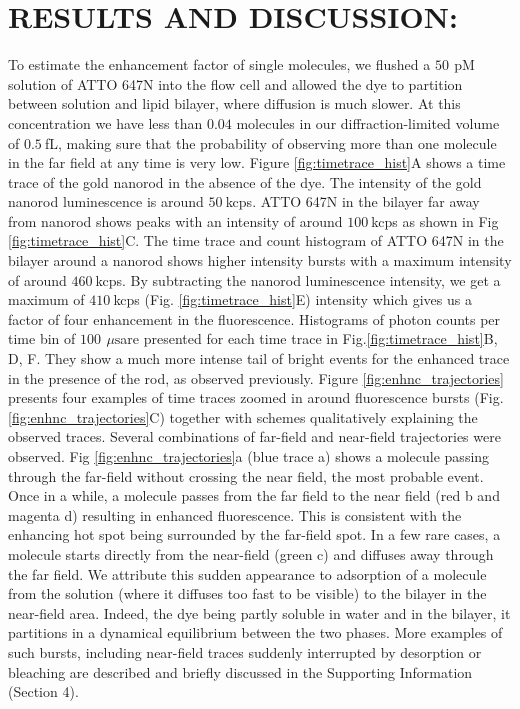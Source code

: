 \documentclass[journal=jacsat,manuscript=article]{achemso}
\newcommand{\pM}{\ensuremath{\,\textrm{pM}}}
\newcommand{\us}{\ensuremath{\,\mu\textrm{s}}}
\begin{document}
\section{RESULTS AND DISCUSSION:}
To estimate the enhancement factor of single molecules, we flushed a $50~$\pM solution of ATTO 647N into the flow cell and allowed the dye to partition between solution and lipid bilayer, where diffusion is much slower. At this concentration we have less than $0.04$ molecules in our diffraction-limited volume of $0.5~$fL, making sure that the probability of observing more than one molecule in the far field at any time is very low. Figure \ref{fig:timetrace_hist}A shows a time trace of the gold nanorod in the absence of the dye. The intensity of the gold nanorod luminescence is around $50~$kcps. ATTO 647N in the bilayer far away from nanorod shows peaks with an intensity of around $100~$kcps as shown in Fig \ref{fig:timetrace_hist}C. The time trace and count histogram of ATTO 647N in the bilayer around a nanorod shows higher intensity bursts with a maximum intensity of around $460~$kcps. By subtracting the nanorod luminescence intensity, we get a maximum of $410~$kcps (Fig. \ref{fig:timetrace_hist}E) intensity which gives us a factor of four enhancement in the fluorescence. Histograms of photon counts per time bin of $100~$\us are presented for each time trace in Fig.\ref{fig:timetrace_hist}B, D, F. They show a much more intense tail of bright events for the enhanced trace in the presence of the rod, as observed previously.\cite{khatua2014resonant} Figure \ref{fig:enhnc_trajectories} presents four examples of time traces zoomed in around fluorescence bursts (Fig. \ref{fig:enhnc_trajectories}C) together with schemes qualitatively explaining the observed traces. Several combinations of far-field and near-field trajectories were observed. Fig \ref{fig:enhnc_trajectories}a (blue trace a) shows a molecule passing through the far-field without crossing the near field, the most probable event. Once in a while, a molecule passes from the far field to the near field (red b and magenta d) resulting in enhanced fluorescence. This is consistent with the enhancing hot spot being surrounded by the far-field spot. In a few rare cases, a molecule starts directly from the near-field (green c) and diffuses away through the far field. We attribute this sudden appearance to adsorption of a molecule from the solution (where it diffuses too fast to be visible) to the bilayer in the near-field area. Indeed, the dye being partly soluble in water and in the bilayer, it partitions in a dynamical equilibrium between the two phases. More examples of such bursts, including near-field traces suddenly interrupted by desorption or bleaching are described and briefly discussed in the Supporting Information (Section 4).
\end{document}
